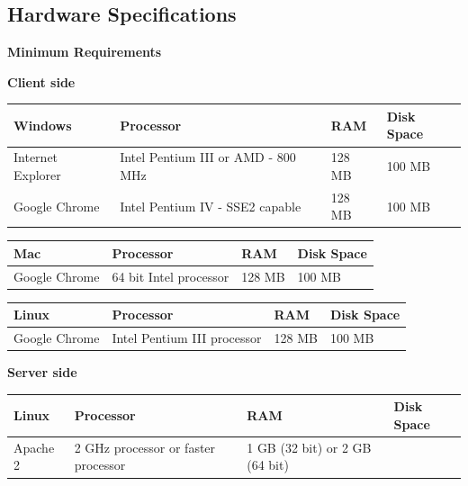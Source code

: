 \documentclass[10pt,onecolumn]{RequimentsGathering}
\begin{document}
\newpage
\subsection{Hardware Specifications }
\textbf{Minimum Requirements}
\begin{center}
	\textbf{Client side}\\
	\begin{tabular}{ | p{5cm} | p{4cm} | p{3cm} | p{3cm} |}
		\hline
		\textbf{Windows} & \textbf{Processor} & \textbf{RAM} & \textbf{Disk Space}\\ \hline
		Internet Explorer	&	Intel Pentium III	
		or AMD - 800 MHz	&	128 MB	&	100 MB		\\ \hline
		Google Chrome		&	Intel Pentium IV - 
		SSE2 capable		&	128 MB	&	100 MB		\\ \hline
	\end{tabular}
	
	
	\begin{tabular}{ | p{5cm} | p{4cm} | p{3cm} | p{3cm} |}
		\hline
		\textbf{Mac} & \textbf{Processor} & \textbf{RAM} & \textbf{Disk Space}\\			\hline
		Google Chrome		&	64 bit Intel  
		processor	       &   128 MB  &	100 MB	\\ \hline
	\end{tabular}
	
	
	\begin{tabular}{ | p{5cm} | p{4cm} | p{3cm} | p{3cm} |}
		\hline			\textbf{Linux} & \textbf{Processor} & \textbf{RAM} & \textbf{Disk Space}\\
		\hline
		Google Chrome		&	Intel Pentium III  
		processor	       &   128 MB  &	100 MB	\\ \hline
	\end{tabular}
	
	\textbf{Server side}\\
	\begin{tabular}{ | p{5cm} | p{4cm} | p{3cm} | p{3cm} |}
		\hline	
		\textbf{Linux} & \textbf{Processor} & \textbf{RAM} & \textbf{Disk Space}\\
		\hline
		Apache 2		&	2 GHz processor or faster  
		processor	       &   1 GB (32 bit) or 2 GB (64 bit)  &		\\ \hline
	\end{tabular}
\end{center}
\end{document}
